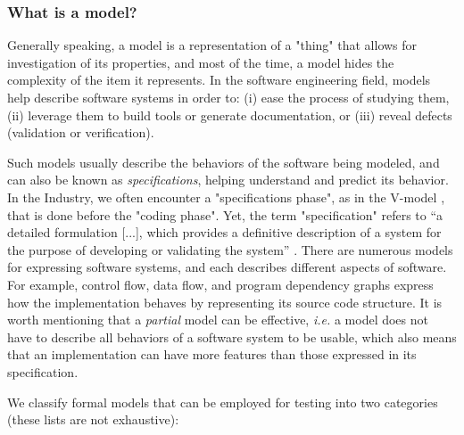 \subsubsection{What is a model?}
\label{sec:related:testing:model}

Generally speaking, a model is a representation of a "thing" that
allows for investigation of its properties, and most of the time,
a model hides the complexity of the item it represents. In the
software engineering field, models help describe software systems
in order to: (i) ease the process of studying them, (ii) leverage
them to build tools or generate documentation, or (iii) reveal
defects (validation or verification).

Such models usually describe the behaviors of the software being
modeled, and can also be known as \emph{specifications}, helping
understand and predict its behavior. In the Industry, we often
encounter a "specifications phase", as in the V-model
\cite{rook1986controlling,mathur2010advancements}, that is done
before the "coding phase". Yet, the term "specification" refers
to \enquote{a detailed formulation [...], which provides a
definitive description of a system for the purpose of developing
or validating the system} \cite{5733835}.  There are numerous
models for expressing software systems, and each describes
different aspects of software. For example, control flow, data
flow, and program dependency graphs express how the
implementation behaves by representing its source code structure.
It is worth mentioning that a \emph{partial} model can be
effective, \emph{i.e.} a model does not have to describe all
behaviors of a software system to be usable, which also means
that an implementation can have more features than those
expressed in its specification.

We classify formal models that can be employed for testing into
two categories (these lists are not exhaustive):

